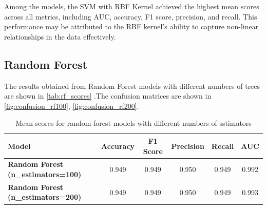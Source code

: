 Among the models, the SVM with RBF Kernel achieved the highest mean scores across all metrics, including AUC, accuracy, F1 score, precision, and recall. This performance may be attributed to the RBF kernel's ability to capture non-linear relationships in the data effectively. 



\subsection*{Random Forest}
The results obtained from Random Forest models with different numbers of trees are shown in \autoref{tab:rf_scores} .The confusion matrices are shown in \autoref{fig:confusion_rf100}, \autoref{fig:confusion_rf200}.

\begin{table}[H]
    \centering
    \begin{tabular}{|p{5cm}|c|c|c|c|c|}
    \hline
    \textbf{Model} & \textbf{Accuracy} & \textbf{F1 Score} & \textbf{Precision} & \textbf{Recall} & \textbf{AUC} \\ \hline
    \textbf{Random Forest (n\_estimators=100)} & 0.949 & 0.949 & 0.950 & 0.949 & 0.992 \\
    \textbf{Random Forest (n\_estimators=200)} & 0.949 & 0.949 & 0.950 & 0.949 & 0.993 \\ \hline
    \end{tabular}
    \caption{Mean scores for random forest models with different numbers of sstimators}
    \label{tab:rf_scores}
\end{table}

